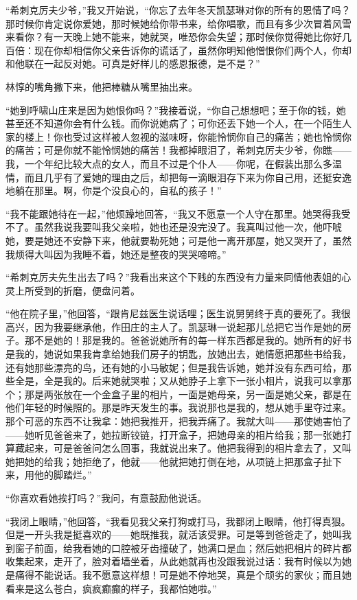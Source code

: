 \par “希刺克厉夫少爷，”我又开始说，“你忘了去年冬天凯瑟琳对你的所有的恩情了吗？那时候你肯定说你爱她，那时候她给你带书来，给你唱歌，而且有多少次冒着风雪来看你？有一天晚上她不能来，她就哭，唯恐你会失望；那时候你觉得她比你好几百倍：现在你却相信你父亲告诉你的谎话了，虽然你明知他憎恨你们两个人，你却和他联在一起反对她。可真是好样儿的感恩报德，是不是？”
\par 林惇的嘴角撇下来，他把棒糖从嘴里抽出来。
\par “她到呼啸山庄来是因为她恨你吗？”我接着说，“你自己想想吧；至于你的钱，她甚至还不知道你会有什么钱。而你说她病了；可你还丢下她一个人，在一个陌生人家的楼上！你也受过这样被人忽视的滋味呀，你能怜悯你自己的痛苦；她也怜悯你的痛苦；可是你就不能怜悯她的痛苦！我都掉眼泪了，希刺克厉夫少爷，你瞧——我，一个年纪比较大点的女人，而且不过是个仆人——你呢，在假装出那么多温情，而且几乎有了爱她的理由之后，却把每一滴眼泪存下来为你自己用，还挺安逸地躺在那里。啊，你是个没良心的，自私的孩子！”
\par “我不能跟她待在一起，”他烦躁地回答，“我又不愿意一个人守在那里。她哭得我受不了。虽然我说我要叫我父亲啦，她也还是没完没了。我真叫过他一次，他吓唬她，要是她还不安静下来，他就要勒死她；可是他一离开那屋，她又哭开了，虽然我烦得大叫因为我睡不着，她还是整夜的哭哭啼啼。”
\par “希刺克厉夫先生出去了吗？”我看出来这个下贱的东西没有力量来同情他表姐的心灵上所受到的折磨，便盘问着。
\par “他在院子里，”他回答，“跟肯尼兹医生说话哩；医生说舅舅终于真的要死了。我很高兴，因为我要继承他，作田庄的主人了。凯瑟琳一说起那儿总把它当作是她的房子。那不是她的！那是我的。爸爸说她所有的每一样东西都是我的。她所有的好书是我的，她说如果我肯拿给她我们房子的钥匙，放她出去，她情愿把那些书给我，还有她那些漂亮的鸟，还有她的小马敏妮；但是我告诉她，她并没有东西可给，那些全是，全是我的。后来她就哭啦；又从她脖子上拿下一张小相片，说我可以拿那个；那是两张放在一个金盒子里的相片，一面是她母亲，另一面是她父亲，都是在他们年轻的时候照的。那是昨天发生的事。我说那也是我的，想从她手里夺过来。那个可恶的东西不让我拿：她把我推开，把我弄痛了。我就大叫——那使她害怕了——她听见爸爸来了，她拉断铰链，打开盒子，把她母亲的相片给我；那一张她打算藏起来，可是爸爸问怎么回事，我就说出来了。他把我得到的相片拿去了，又叫她把她的给我；她拒绝了，他就——他就把她打倒在地，从项链上把那盒子扯下来，用他的脚踏烂。”
\par “你喜欢看她挨打吗？”我问，有意鼓励他说话。
\par “我闭上眼睛，”他回答，“我看见我父亲打狗或打马，我都闭上眼睛，他打得真狠。但是一开头我是挺喜欢的——她既推我，就活该受罪。可是等到爸爸走了，她叫我到窗子前面，给我看她的口腔被牙齿撞破了，她满口是血；然后她把相片的碎片都收集起来，走开了，脸对着墙坐着，从此她就再也没跟我说过话：我有时候以为她是痛得不能说话。我不愿意这样想！可是她不停地哭，真是个顽劣的家伙；而且她看来是这么苍白，疯疯癫癫的样子，我都怕她啦。”
